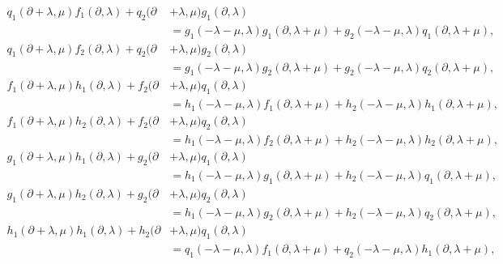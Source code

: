 \documentclass[11pt,letterpaper,reqno]{amsart}
\theoremstyle{definition}
\numberwithin{equation}{section}
\begin{document}
\begin{align}
q_1(\partial+\lambda, \mu)f_1(\partial, \lambda)+q_2(\partial&+\lambda, \mu)g_1(\partial, \lambda)\nonumber\\
&=g_1(-\lambda-\mu, \lambda)g_1(\partial, \lambda+\mu)+g_2(-\lambda-\mu, \lambda)q_1(\partial, \lambda+\mu),\label{yyy14}\\
q_1(\partial+\lambda, \mu)f_2(\partial, \lambda)+q_2(\partial&+\lambda, \mu)g_2(\partial, \lambda)\nonumber\\
&=g_1(-\lambda-\mu, \lambda)g_2(\partial, \lambda+\mu)+g_2(-\lambda-\mu, \lambda)q_2(\partial, \lambda+\mu),\label{yyy15}\\
f_1(\partial+\lambda, \mu)h_1(\partial, \lambda)+f_2(\partial&+\lambda, \mu)q_1(\partial, \lambda)\nonumber\\
&=h_1(-\lambda-\mu, \lambda)f_1(\partial, \lambda+\mu)+h_2(-\lambda-\mu, \lambda)h_1(\partial, \lambda+\mu),\label{yyy16}\\
f_1(\partial+\lambda, \mu)h_2(\partial, \lambda)+f_2(\partial&+\lambda, \mu)q_2(\partial, \lambda)\nonumber\\
&=h_1(-\lambda-\mu, \lambda)f_2(\partial, \lambda+\mu)+h_2(-\lambda-\mu, \lambda)h_2(\partial, \lambda+\mu),\label{yyy17}\\
g_1(\partial+\lambda, \mu)h_1(\partial, \lambda)+g_2(\partial&+\lambda, \mu)q_1(\partial, \lambda)\nonumber\\
&=h_1(-\lambda-\mu, \lambda)g_1(\partial, \lambda+\mu)+h_2(-\lambda-\mu, \lambda)q_1(\partial, \lambda+\mu),\label{yyy18}\\
g_1(\partial+\lambda, \mu)h_2(\partial, \lambda)+g_2(\partial&+\lambda, \mu)q_2(\partial, \lambda)\nonumber\\
&=h_1(-\lambda-\mu, \lambda)g_2(\partial, \lambda+\mu)+h_2(-\lambda-\mu, \lambda)q_2(\partial, \lambda+\mu),\label{yyy19}\\
h_1(\partial+\lambda, \mu)h_1(\partial, \lambda)+h_2(\partial&+\lambda, \mu)q_1(\partial, \lambda)\nonumber\\
&=q_1(-\lambda-\mu, \lambda)f_1(\partial, \lambda+\mu)+q_2(-\lambda-\mu, \lambda)h_1(\partial, \lambda+\mu),\label{yyy20}\\

\end{align}
\end{document}
